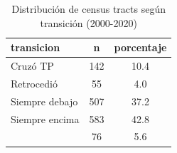 \begin{table}[ht]
\centering
\caption{Distribución de census tracts según transición (2000-2020)} 
\label{tab:transiciones}
\begin{tabular}{lcc}
  \toprule
transicion & n & porcentaje \\ 
  \midrule
Cruzó TP & 142 & 10.4 \\ 
  Retrocedió & 55 & 4.0 \\ 
  Siempre debajo & 507 & 37.2 \\ 
  Siempre encima & 583 & 42.8 \\ 
   & 76 & 5.6 \\ 
   \bottomrule
\end{tabular}
\end{table}
